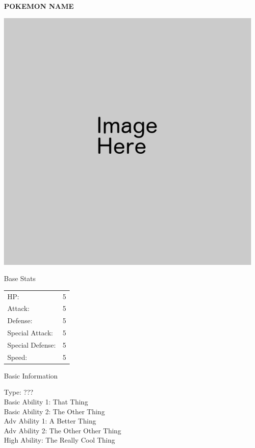 \documentclass{article}
\begin{document}
\begin{multicols}{2}
\textbf{POKEMON NAME} 

\includegraphics[width=0.9\linewidth]{Blank.png}

\begin{center}Base Stats\end{center}
\begin{tabular}{ l l }
HP: & 5\\
Attack: & 5\\
Defense: & 5\\
Special Attack: & 5\\
Special Defense: & 5\\
Speed: & 5\\
\end{tabular}
\begin{center}Basic Information\end{center}
Type: ???\\
Basic Ability 1: That Thing\\
Basic Ability 2: The Other Thing\\
Adv Ability 1: A Better Thing\\
Adv Ability 2: The Other Other Thing\\
High Ability: The Really Cool Thing\\


\end{multicols}
\end{document}
